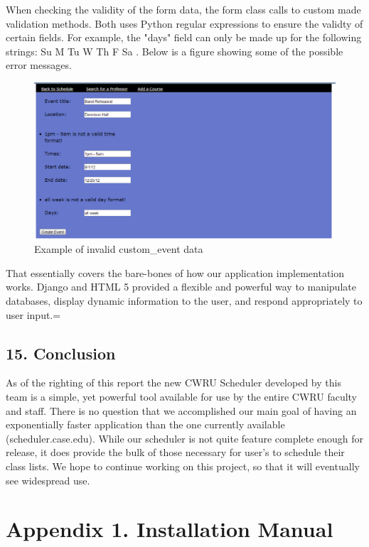 \documentclass[pdftex,12pt,letter]{article}
\begin{document}
When checking the validity of the form data, the form class calls to custom made validation methods. Both uses Python regular expressions to ensure the validty of certain fields. For example, the "days" field can only be made up for the following strings: Su M Tu W Th F Sa . Below is a figure showing some of the possible error messages.
\begin{figure}
\includegraphics[width=6in]{eventErr.png}
\caption{Example of invalid custom\_event data}
\end{figure}
\FloatBarrier

That essentially covers the bare-bones of how our application implementation works. Django and HTML 5 provided a flexible and powerful way to manipulate databases, display dynamic information to the user, and respond appropriately to user input.=

%

\subsection*{15. Conclusion}
As of the righting of this report the new CWRU Scheduler developed by this team is a simple, yet powerful tool available for use by the entire CWRU faculty and staff. There is no question that we accomplished our main goal of having an exponentially faster application than the one currently available (scheduler.case.edu). While our scheduler is not quite feature complete enough for release, it does provide the bulk of those necessary for user's to schedule their class lists. We hope to continue working on this project, so that it will eventually see widespread use.

\newpage
\appendix
\section{Appendix 1. Installation Manual}
\end{document}
